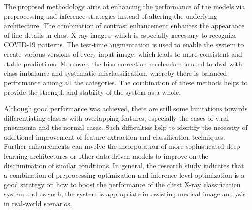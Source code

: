 \documentclass[a4paper,fleqn]{cas-dc}
\begin{document}
The proposed methodology aims at enhancing the performance of the models via preprocessing and inference strategies instead of altering the underlying architecture. The combination of contrast enhancement enhances the appearance of fine details in chest X-ray images, which is especially necessary to recognize COVID-19 patterns. The test-time augmentation is used to enable the system to create various versions of every input image, which leads to more consistent and stable predictions. Moreover, the bias correction mechanism is used to deal with class imbalance and systematic misclassification, whereby there is balanced performance among all the categories. The combination of these methods helps to provide the strength and stability of the system as a whole.

Although good performance was achieved, there are still some limitations towards differentiating classes with overlapping features, especially the cases of viral pneumonia and the normal cases. Such difficulties help to identify the necessity of additional improvement of feature extraction and classification techniques. Further enhancements can involve the incorporation of more sophisticated deep learning architectures or other data-driven models to improve on the discrimination of similar conditions. In general, the research study indicates that a combination of preprocessing optimization and inference-level optimization is a good strategy on how to boost the performance of the chest X-ray classification system and as such, the system is appropriate in assisting medical image analysis in real-world scenarios.

 				

\end{document}
